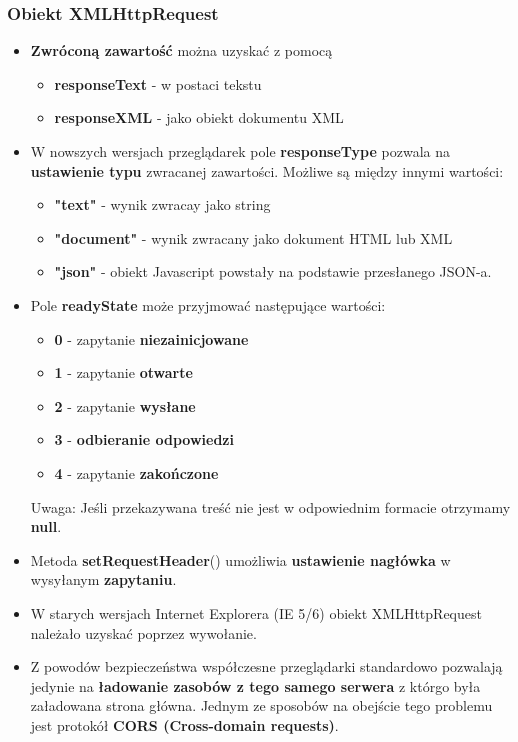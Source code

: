 \documentclass[../main.tex]{subfiles}
\begin{document}
    \subsubsection{Obiekt XMLHttpRequest}
    \begin{itemize}
        \item \textbf{Zwróconą zawartość} można uzyskać z pomocą
        \begin{itemize}
            \item \textbf{responseText} - w postaci tekstu
            \item \textbf{responseXML} - jako obiekt dokumentu XML
        \end{itemize}
        \item W nowszych wersjach przeglądarek pole \textbf{responseType} pozwala na
        \textbf{ustawienie typu} zwracanej zawartości. Możliwe są między innymi wartości:
        \begin{itemize}
            \item \textbf{"text"} - wynik zwracay jako string
            \item \textbf{"document"} - wynik zwracany jako dokument HTML lub XML
            \item \textbf{"json"} - obiekt Javascript powstały na podstawie przesłanego JSON-a.
        \end{itemize}
        \item Pole \textbf{readyState} może przyjmować następujące wartości:
        \begin{itemize}
            \item \textbf{0} - zapytanie \textbf{niezainicjowane}
            \item \textbf{1} - zapytanie \textbf{otwarte}
            \item \textbf{2} - zapytanie \textbf{wysłane}
            \item \textbf{3} - \textbf{odbieranie odpowiedzi}
            \item \textbf{4} - zapytanie \textbf{zakończone}
        \end{itemize}
        Uwaga: Jeśli przekazywana treść nie jest w odpowiednim formacie otrzymamy
        \textbf{null}.
        \item Metoda \textbf{setRequestHeader}() umożliwia \textbf{ustawienie nagłówka} w wysyłanym \textbf{zapytaniu}.
        \item W starych wersjach Internet Explorera (IE 5/6) obiekt XMLHttpRequest należało
        uzyskać poprzez wywołanie.
        \item Z powodów bezpieczeństwa współczesne przeglądarki standardowo
        pozwalają jedynie na \textbf{ładowanie zasobów z tego samego serwera} z którgo była
        załadowana strona główna. Jednym ze sposobów na obejście tego problemu
        jest protokół \textbf{CORS (Cross-domain requests)}.
    \end{itemize}
\end{document}
